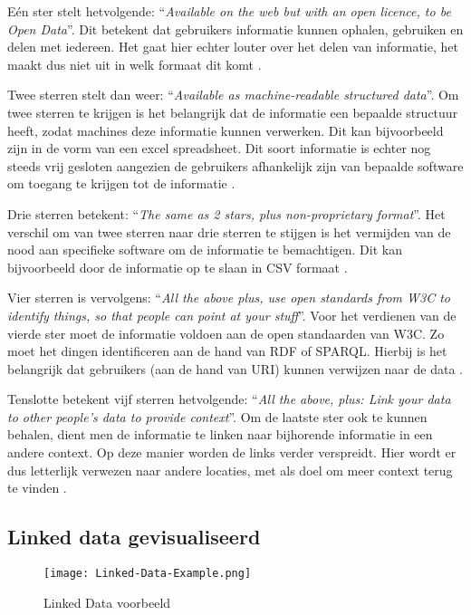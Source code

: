 Eén ster stelt hetvolgende: ``\textit{Available on the web but with an open licence, to be Open Data}''. Dit betekent dat gebruikers informatie kunnen ophalen, gebruiken en delen met iedereen. Het gaat hier echter louter over het delen van informatie, het maakt dus niet uit in welk formaat dit komt \cite{berners2006linkeddata}. 

Twee sterren stelt dan weer: ``\textit{Available as machine-readable structured data}''. Om twee sterren te krijgen is het belangrijk dat de informatie een bepaalde structuur heeft, zodat machines deze informatie kunnen verwerken. Dit kan bijvoorbeeld zijn in de vorm van een excel spreadsheet. Dit soort informatie is echter nog steeds vrij gesloten aangezien de gebruikers afhankelijk zijn van bepaalde software om toegang te krijgen tot de informatie \cite{berners2006linkeddata}.

Drie sterren betekent: ``\textit{The same as 2 stars, plus non-proprietary format}''. Het verschil om van twee sterren naar drie sterren te stijgen is het vermijden van de nood aan specifieke software om de informatie te bemachtigen. Dit kan bijvoorbeeld door de informatie op te slaan in CSV formaat \cite{berners2006linkeddata}.

Vier sterren is vervolgens: ``\textit{All the above plus, use open standards from W3C to identify things, so that people can point at your stuff}''. Voor het verdienen van de vierde ster moet de informatie voldoen aan de open standaarden van W3C. Zo moet het dingen identificeren aan de hand van RDF of SPARQL. Hierbij is het belangrijk dat gebruikers (aan de hand van URI) kunnen verwijzen naar de data \cite{berners2006linkeddata}.

Tenslotte betekent vijf sterren hetvolgende: ``\textit{All the above, plus: Link your data to other people’s data to provide context}''. Om de laatste ster ook te kunnen behalen, dient men de informatie te linken naar bijhorende informatie in een andere context. Op deze manier worden de links verder verspreidt. Hier wordt er dus letterlijk verwezen naar andere locaties, met als doel om meer context terug te vinden \cite{berners2006linkeddata}.

\subsection{Linked data gevisualiseerd}

\begin{figure}[ht!]
    \centering
    \texttt{[image: Linked-Data-Example.png]}
    \caption{Linked Data voorbeeld}
    \label{fig:linked_data_example}
\end{figure}

